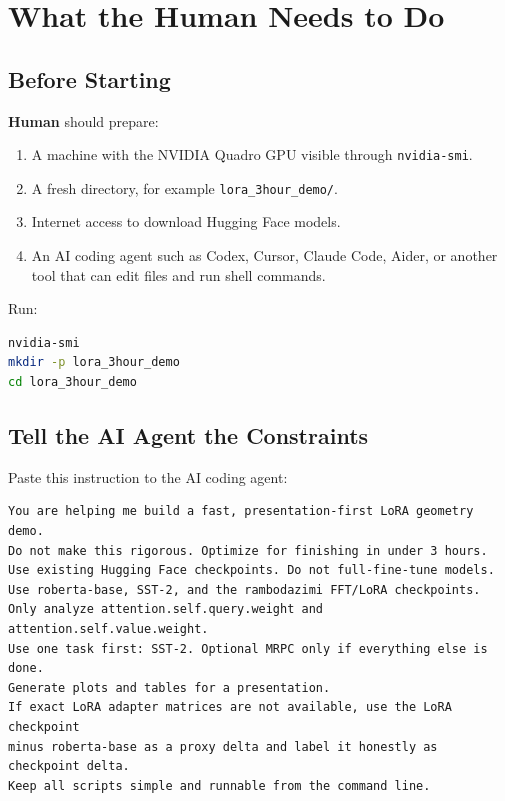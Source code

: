 \documentclass[11pt]{article}
\newcommand{\human}{\textbf{Human}}
\begin{document}
\section{What the Human Needs to Do}

\subsection{Before Starting}

\human{} should prepare:

\begin{enumerate}[leftmargin=*]
    \item A machine with the NVIDIA Quadro GPU visible through \texttt{nvidia-smi}.
    \item A fresh directory, for example \texttt{lora\_3hour\_demo/}.
    \item Internet access to download Hugging Face models.
    \item An AI coding agent such as Codex, Cursor, Claude Code, Aider, or another tool that can edit files and run shell commands.
\end{enumerate}

Run:

\begin{lstlisting}[language=bash]
nvidia-smi
mkdir -p lora_3hour_demo
cd lora_3hour_demo
\end{lstlisting}

\subsection{Tell the AI Agent the Constraints}

Paste this instruction to the AI coding agent:

\begin{lstlisting}
You are helping me build a fast, presentation-first LoRA geometry demo.
Do not make this rigorous. Optimize for finishing in under 3 hours.
Use existing Hugging Face checkpoints. Do not full-fine-tune models.
Use roberta-base, SST-2, and the rambodazimi FFT/LoRA checkpoints.
Only analyze attention.self.query.weight and attention.self.value.weight.
Use one task first: SST-2. Optional MRPC only if everything else is done.
Generate plots and tables for a presentation.
If exact LoRA adapter matrices are not available, use the LoRA checkpoint
minus roberta-base as a proxy delta and label it honestly as checkpoint delta.
Keep all scripts simple and runnable from the command line.
\end{lstlisting}
\end{document}
